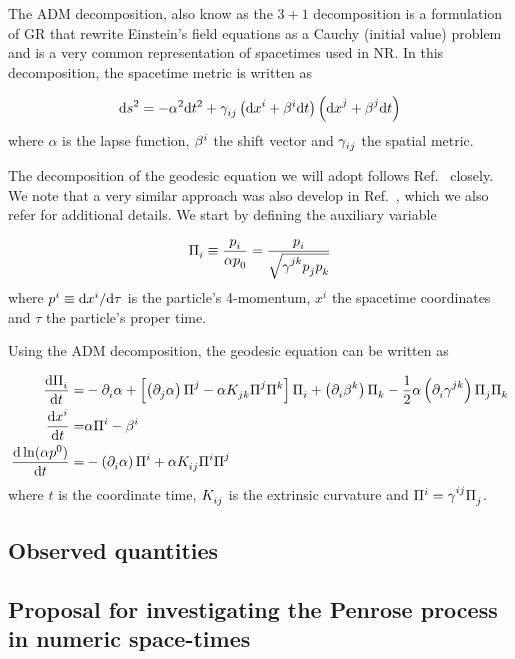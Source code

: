 The ADM decomposition, also know as the $3+1$ decomposition is a formulation of GR that rewrite Einstein's field equations as a Cauchy (initial value) problem and is a very common representation of spacetimes used in NR. In this decomposition, the spacetime metric is written as~\cite{BAUMGARTE}

\begin{equation}
  \ud s^2 = -\alpha^2 \ud t^2 + \tens{\gamma}{}{ij} \left( \ud \tens{x}{i}{} + \tens{\beta}{i}{}\ud t\right) \left( \ud \tens{x}{j}{} + \tens{\beta}{j}{}\ud t\right)
  \label{ch:penrose_binaries/eq:adm_metric}
\end{equation}
%
where $\alpha$ is the lapse function, $\tens{\beta}{i}{}$ the shift vector and $\tens{\gamma}{}{ij}$ the spatial metric.

The decomposition of the geodesic equation we will adopt follows Ref.~\cite{BOHN2015} closely. We note that a very similar approach was also develop in Ref.~\cite{VINCENT2012}, which we also refer for additional details. We start by defining the auxiliary variable

\begin{equation}
  \tens{\Pi}{}{i} \equiv \frac{\tens{p}{}{i}}{\alpha \tens{p}{}{0}} = \frac{\tens{p}{}{i}}{\sqrt{\tens{\gamma}{jk}{} \tens{p}{}{j} \tens{p}{}{k}}}
  \label{ch:penrose_binaries/eq:big_pi_def}
\end{equation}
%
where $p^i \equiv \mathrm{d} x^{i}/\mathrm{d} \tau$ is the particle's 4-momentum, $x^i$ the spacetime coordinates and $\tau$ the particle's proper time.

Using the ADM decomposition, the geodesic equation can be written as~\cite{BOHN2015}

\begin{align}
  \der{\tens{\Pi}{}{i}}{t} =          & -\indexdel{i}\alpha + \left[ \left( \indexdel{j}\alpha \right) \tens{\Pi}{j}{} - \alpha \tens{K}{}{jk} \tens{\Pi}{j}{} \tens{\Pi}{k}{}\right]\tens{\Pi}{}{i} + \left( \indexdel{i}\tens{\beta}{k}{} \right) \tens{\Pi}{}{k} - \frac{1}{2} \alpha \left( \indexdel{i} \tens{\gamma}{jk}{} \right) \tens{\Pi}{}{j} \tens{\Pi}{}{k} \\
  \der{\tens{x}{i}{}}{t} =            & \alpha \tens{\Pi}{i}{} - \tens{\beta}{i}{}                                                                                                                                                                                                                                                                                       \\
  \der{\ln(\alpha\tens{p}{0}{})}{t} = & -\left( \indexdel{i} \alpha \right) \tens{\Pi}{i}{} + \alpha \tens{K}{}{ij}\tens{\Pi}{i}{}\tens{\Pi}{j}{}
  \label{ch:penrose_binaries/eq:adm_geodesic_eq}
\end{align}
%
where $t$ is the coordinate time, $\tens{K}{}{ij}$ is the extrinsic curvature and $\tens{\Pi}{i}{} = \tens{\gamma}{ij}{}\tens{\Pi}{}{j}$.
\subsection{Observed quantities}
\subsection{Proposal for investigating the Penrose process in numeric space-times}
